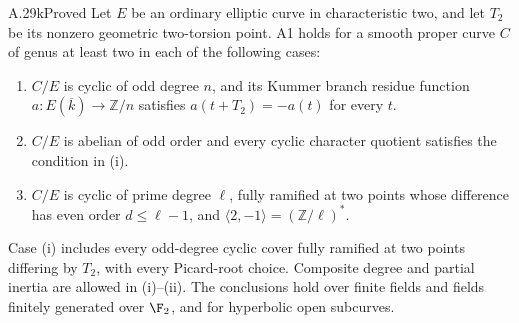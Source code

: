 \begin{claim}{A.29k}{Proved}
Let $E$ be an ordinary elliptic curve in characteristic
two, and let $T_2$ be its nonzero geometric two-torsion
point. A1 holds for a smooth proper curve $C$ of genus
at least two in each of the following cases:
\begin{enumerate}[label=(\roman*)]
\item $C/E$ is cyclic of odd degree $n$, and its Kummer
branch residue function $a:E(\overline k)\to\mathbb Z/n$
satisfies $a(t+T_2)=-a(t)$ for every $t$.
\item $C/E$ is abelian of odd order and every cyclic
character quotient satisfies the condition in \textup{(i)}.
\item $C/E$ is cyclic of prime degree $\ell$, fully
ramified at two points whose difference has even order
$d\le\ell-1$, and
$\langle2,-1\rangle=(\mathbb Z/\ell)^*$.
\end{enumerate}
Case \textup{(i)} includes every odd-degree cyclic
cover fully ramified at two points differing by $T_2$,
with every Picard-root choice. Composite degree and
partial inertia are allowed in \textup{(i)--(ii)}.
The conclusions hold over finite fields and fields
finitely generated over $\F_2$, and for hyperbolic open
subcurves.
\end{claim}
